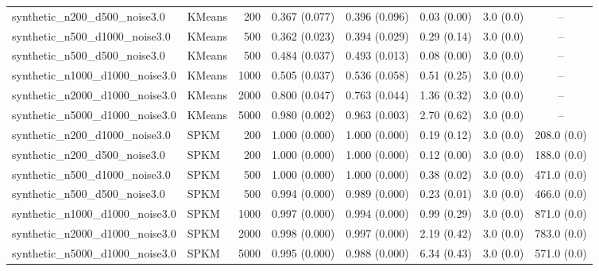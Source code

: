 \begin{table}[t]
\begin{tabular}{llrccccc}
synthetic_n200_d500_noise3.0 & KMeans & 200 & 0.367 (0.077) & 0.396 (0.096) & 0.03 (0.00) & 3.0 (0.0) & -- \\
synthetic_n500_d1000_noise3.0 & KMeans & 500 & 0.362 (0.023) & 0.394 (0.029) & 0.29 (0.14) & 3.0 (0.0) & -- \\
synthetic_n500_d500_noise3.0 & KMeans & 500 & 0.484 (0.037) & 0.493 (0.013) & 0.08 (0.00) & 3.0 (0.0) & -- \\
synthetic_n1000_d1000_noise3.0 & KMeans & 1000 & 0.505 (0.037) & 0.536 (0.058) & 0.51 (0.25) & 3.0 (0.0) & -- \\
synthetic_n2000_d1000_noise3.0 & KMeans & 2000 & 0.800 (0.047) & 0.763 (0.044) & 1.36 (0.32) & 3.0 (0.0) & -- \\
synthetic_n5000_d1000_noise3.0 & KMeans & 5000 & 0.980 (0.002) & 0.963 (0.003) & 2.70 (0.62) & 3.0 (0.0) & -- \\
synthetic_n200_d1000_noise3.0 & SPKM & 200 & 1.000 (0.000) & 1.000 (0.000) & 0.19 (0.12) & 3.0 (0.0) & 208.0 (0.0) \\
synthetic_n200_d500_noise3.0 & SPKM & 200 & 1.000 (0.000) & 1.000 (0.000) & 0.12 (0.00) & 3.0 (0.0) & 188.0 (0.0) \\
synthetic_n500_d1000_noise3.0 & SPKM & 500 & 1.000 (0.000) & 1.000 (0.000) & 0.38 (0.02) & 3.0 (0.0) & 471.0 (0.0) \\
synthetic_n500_d500_noise3.0 & SPKM & 500 & 0.994 (0.000) & 0.989 (0.000) & 0.23 (0.01) & 3.0 (0.0) & 466.0 (0.0) \\
synthetic_n1000_d1000_noise3.0 & SPKM & 1000 & 0.997 (0.000) & 0.994 (0.000) & 0.99 (0.29) & 3.0 (0.0) & 871.0 (0.0) \\
synthetic_n2000_d1000_noise3.0 & SPKM & 2000 & 0.998 (0.000) & 0.997 (0.000) & 2.19 (0.42) & 3.0 (0.0) & 783.0 (0.0) \\
synthetic_n5000_d1000_noise3.0 & SPKM & 5000 & 0.995 (0.000) & 0.988 (0.000) & 6.34 (0.43) & 3.0 (0.0) & 571.0 (0.0) \\
\bottomrule
\end{tabular}
\end{table}
